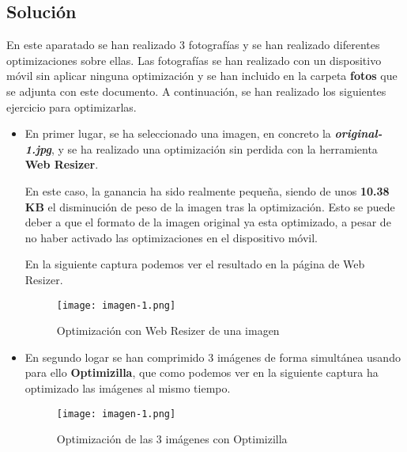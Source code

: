 \subsection{Solución}
En este aparatado se han realizado 3 fotografías y se han realizado diferentes optimizaciones sobre ellas. Las fotografías se han realizado con un dispositivo móvil sin aplicar ninguna optimización y se han incluido en la carpeta \textbf{fotos} que se adjunta con este documento. A continuación, se han realizado los siguientes ejercicio para optimizarlas.

\begin{itemize}
    \item En primer lugar, se ha seleccionado una imagen, en concreto la \textbf{\textit{original-1.jpg}}, y se ha realizado una optimización sin perdida con la herramienta \textbf{Web Resizer}.

    En este caso, la ganancia ha sido realmente pequeña, siendo de unos \textbf{10.38 KB} el disminución de peso de la imagen tras la optimización. Esto se puede deber a que el formato de la imagen original ya esta optimizado, a pesar de no haber activado las optimizaciones en el dispositivo móvil.

    En la siguiente captura podemos ver el resultado en la página de Web Resizer.

    \begin{figure}[H]
        \centering
        \texttt{[image: imagen-1.png]}
        \caption{Optimización con Web Resizer de una imagen}
    \end{figure}

    \item En segundo logar se han comprimido 3 imágenes de forma simultánea usando para ello \textbf{Optimizilla}, que como podemos ver en la siguiente captura ha optimizado las imágenes al mismo tiempo.

    \begin{figure}[H]
        \centering
        \texttt{[image: imagen-1.png]}
        \caption{Optimización de las 3 imágenes con Optimizilla}
    \end{figure}
\end{itemize}


%
%

